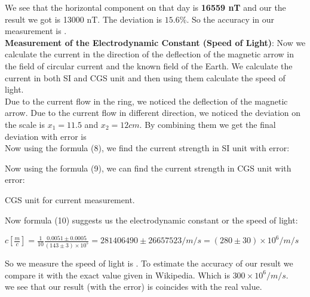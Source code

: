 \documentclass[a4paper, 12pt]{article}%
\begin{document}
We see that the horizontal component on that day is \textbf{16559 nT} and our the result we got is 13000 nT. The deviation is $15.6\%$. So the accuracy in our measurement is .\\
\newline
\textbf{Measurement of the Electrodynamic Constant (Speed of Light)}:
Now we calculate the current in the direction of the deflection of the magnetic arrow in the field of circular current and the known field of the Earth. We calculate the current in both SI and CGS unit and then using them calculate the speed of light.\\
\newline
Due to the current flow in the ring, we noticed the deflection of the magnetic arrow. Due to the current flow in different direction, we noticed the deviation on the scale is $x_1 = 11.5$ and $x_2 = 12 cm$. By combining them we get the final deviation with error is  \\
\newline 
Now using the formula (8), we find the current strength in SI unit with error:
\begin{center}
\end{center}
Now using the formula (9), we can find the current strength in CGS unit with error:
\begin{center}
 CGS unit for current measurement.
\end{center}

Now formula (10) suggests us the electrodynamic constant or the speed of light:
\begin{center}
$c[\frac{m}{c}]= \frac{1}{10}\frac{0.0051 \pm 0.0005}{(143 \pm 3) \times 10^5} = 281406490 \pm 26657523 / m/s = (280 \pm 30) \times 10^6  / m/s$
\end{center}
So we measure the speed of light is . To estimate the accuracy of our result we compare it with the exact value given in Wikipedia. Which is $300 \times 10^6 / m/s$.\\
\newline
we see that our result (with the error) is coincides with the real value.
\end{document}
